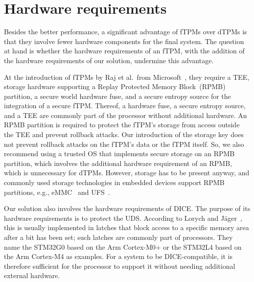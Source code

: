 \section{Hardware requirements}

Besides the better performance, a significant advantage of \acp{fTPM} over \acp{dTPM} is that they involve fewer hardware components for the final system.
The question at hand is whether the hardware requirements of an fTPM, with the addition of the hardware requirements of our solution, undermine this advantage.

At the introduction of \acp{fTPM} by Raj et al.\ from Microsoft~\cite{Raj2015}, they require a TEE, storage hardware supporting a Replay Protected Memory Block~(RPMB) partition, a secure world hardware fuse, and a secure entropy source for the integration of a secure \ac{fTPM}\@.
Thereof, a hardware fuse, a secure entropy source, and a TEE are commonly part of the processor without additional hardware.
An RPMB partition is required to protect the fTPM's storage from access outside the TEE and prevent rollback attacks.
Our introduction of the storage key does not prevent rollback attacks on the fTPM's data or the fTPM itself.
So, we also recommend using a trusted OS that implements secure storage on an RPMB partition, which involves the additional hardware requirement of an RPMB, which is unnecessary for \acp{dTPM}.
However, storage has to be present anyway, and commonly used storage technologies in embedded devices support RPMB partitions, e.g., eMMC~\cite{eMMC} and UFS~\cite{UFS}.




Our solution also involves the hardware requirements of DICE\@.
The purpose of its hardware requirements is to protect the \ac{UDS}\@.
According to Lorych and Jäger~\cite{Lorych2022}, this is usually implemented in latches that block access to a specific memory area after a bit has been set; such latches are commonly part of processors.
They name the STM32G0 based on the Arm Cortex-M0+ or the STM32L4 based on the Arm Cortex-M4 as examples.
For a system to be DICE-compatible, it is therefore sufficient for the processor to support it without needing additional external hardware.

